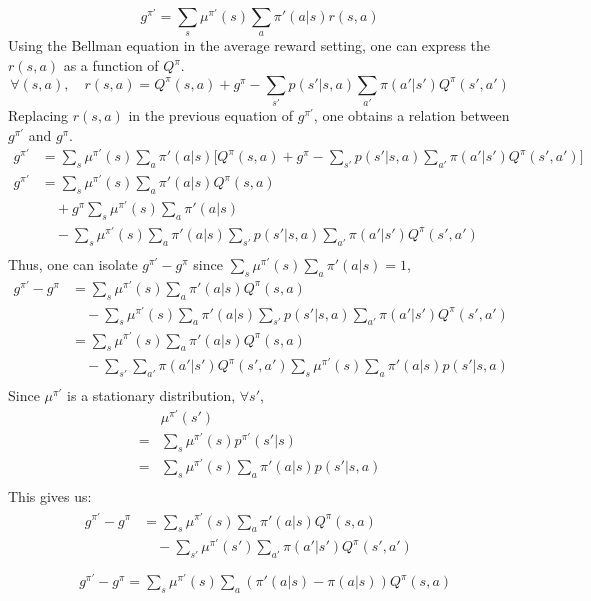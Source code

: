 \documentclass[a4paper]{article}
\begin{document}
\[
	g^{\pi'} = \sum_s \mu^{\pi'}(s) \sum_a \pi'(a|s)r(s,a)
\]
Using the Bellman equation in the average reward setting, one can express the $r(s,a)$ as a function of $Q^\pi$.
\[
	\forall (s,a), \quad r(s,a) = Q^\pi(s,a) + g^\pi - \sum_{s'} p(s'|s,a) \sum_{a'} \pi(a'|s') Q^\pi(s',a')
\]
Replacing $r(s,a)$ in the previous equation of $g^{\pi'}$, one obtains a relation between $g^{\pi'}$ and $g^{\pi}$.
\[
\begin{aligned}
	g^{\pi'}
	&= \sum_s \mu^{\pi'}(s) \sum_a \pi'(a|s) \big[Q^\pi(s,a) + g^\pi - \sum_{s'} p(s'|s,a) \sum_{a'} \pi(a'|s') Q^\pi(s',a')\big] \\
	g^{\pi'}
	&= \sum_s \mu^{\pi'}(s) \sum_a \pi'(a|s)Q^\pi(s,a) \\
	&\quad + g^\pi \sum_s \mu^{\pi'}(s) \sum_a \pi'(a|s) \\
	&\quad - \sum_s \mu^{\pi'}(s) \sum_a \pi'(a|s) \sum_{s'} p(s'|s,a) \sum_{a'} \pi(a'|s') Q^\pi(s',a') \\
\end{aligned}
\]
Thus, one can isolate $g^{\pi'} - g^\pi$ since $\sum_s \mu^{\pi'}(s) \sum_a \pi'(a|s) = 1$,
\[
\begin{aligned}
	g^{\pi'} - g^\pi
	&= \sum_s \mu^{\pi'}(s) \sum_a \pi'(a|s)Q^\pi(s,a) \\
	&\quad - \sum_s \mu^{\pi'}(s) \sum_a \pi'(a|s) \sum_{s'} p(s'|s,a) \sum_{a'} \pi(a'|s') Q^\pi(s',a') \\
	&= \sum_s \mu^{\pi'}(s) \sum_a \pi'(a|s)Q^\pi(s,a) \\
	&\quad - \sum_{s'} \sum_{a'} \pi(a'|s') Q^\pi(s',a') \sum_{s} \mu^{\pi'}(s) \sum_{a} \pi'(a|s) p(s'|s,a) \\
\end{aligned}
\]
Since $\mu^{\pi'}$ is a stationary distribution, $\forall s'$,
\[
\begin{aligned}
	& \mu^{\pi'}(s') \\
	= & \sum_{s} \mu^{\pi'}(s) p^{\pi'}(s'|s) \\
	= & \sum_{s} \mu^{\pi'}(s) \sum_{a} \pi'(a|s) p(s'|s,a) \\
\end{aligned}
\]
This gives us:
\[
\begin{aligned}
	&\begin{aligned}
		g^{\pi'} - g^\pi
		&= \sum_s \mu^{\pi'}(s) \sum_a \pi'(a|s)Q^\pi(s,a) \\
		&\quad - \sum_{s'} \mu^{\pi'}(s') \sum_{a'} \pi(a'|s') Q^\pi(s',a') \\
	\end{aligned}\\
	&\boxed{g^{\pi'} - g^\pi = \sum_s \mu^{\pi'}(s) \sum_a (\pi'(a|s)-\pi(a|s))Q^\pi(s,a)}
\end{aligned}
\]
\end{document}
